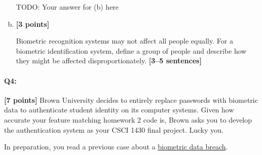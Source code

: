 \documentclass[11pt]{article}
\begin{document}
\begin{enumerate}[(a)]
\begin{tcolorbox}[colback=white!5!white,colframe=green!75!black]
{{        TODO: Your answer for (b) here %
            
        }}
    \end{tcolorbox}


    \item
    \textbf{[3 points]}
    \begin{tcolorbox}[colback=orange!5!white,colframe=orange!75!black]
    Biometric recognition systems may not affect all people equally. For a biometric identification system, define a group of people and describe how they might be affected disproportionately. \textbf{[3--5 sentences]}
    \end{tcolorbox}
    
\end{enumerate}

\pagebreak



\paragraph{Q4:} \textbf{[7 points]} Brown University decides to entirely replace passwords with biometric data to authenticate student identity on its computer systems. Given how accurate your feature matching homework 2 code is, Brown asks you to develop the authentication system as your CSCI 1430 final project. Lucky you.

In preparation, you read a previous case about a \href{https://www.vpnmentor.com/blog/report-biostar2-leak/}{biometric data breach}.
\end{document}

